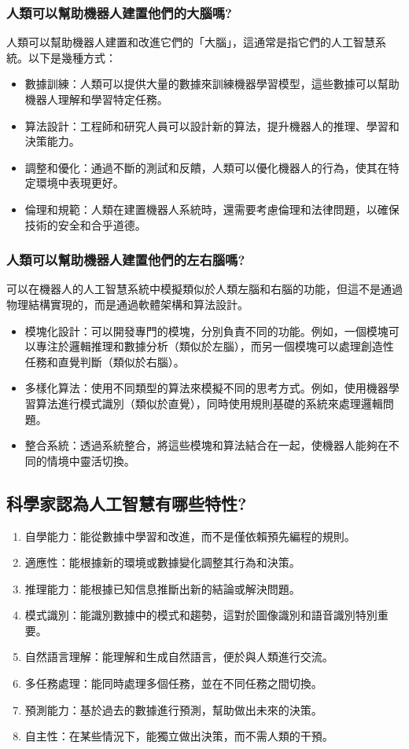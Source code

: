 \subsubsection{人類可以幫助機器人建置他們的大腦嗎?}
人類可以幫助機器人建置和改進它們的「大腦」，這通常是指它們的人工智慧系統。以下是幾種方式：
\begin{itemize}
    \item 數據訓練：人類可以提供大量的數據來訓練機器學習模型，這些數據可以幫助機器人理解和學習特定任務。
    \item 算法設計：工程師和研究人員可以設計新的算法，提升機器人的推理、學習和決策能力。 
    \item 調整和優化：通過不斷的測試和反饋，人類可以優化機器人的行為，使其在特定環境中表現更好。 
    \item 倫理和規範：人類在建置機器人系統時，還需要考慮倫理和法律問題，以確保技術的安全和合乎道德。
\end{itemize}

\subsubsection{人類可以幫助機器人建置他們的左右腦嗎?}
可以在機器人的人工智慧系統中模擬類似於人類左腦和右腦的功能，但這不是通過物理結構實現的，而是通過軟體架構和算法設計。
\begin{itemize}
    \item 模塊化設計：可以開發專門的模塊，分別負責不同的功能。例如，一個模塊可以專注於邏輯推理和數據分析（類似於左腦），而另一個模塊可以處理創造性任務和直覺判斷（類似於右腦）。
    \item 多樣化算法：使用不同類型的算法來模擬不同的思考方式。例如，使用機器學習算法進行模式識別（類似於直覺），同時使用規則基礎的系統來處理邏輯問題。
    \item 整合系統：透過系統整合，將這些模塊和算法結合在一起，使機器人能夠在不同的情境中靈活切換。
\end{itemize}

\subsection{科學家認為人工智慧有哪些特性?}
\begin{enumerate}
    \item 自學能力：能從數據中學習和改進，而不是僅依賴預先編程的規則。
    \item 適應性：能根據新的環境或數據變化調整其行為和決策。
    \item 推理能力：能根據已知信息推斷出新的結論或解決問題。
    \item 模式識別：能識別數據中的模式和趨勢，這對於圖像識別和語音識別特別重要。
    \item 自然語言理解：能理解和生成自然語言，便於與人類進行交流。
    \item 多任務處理：能同時處理多個任務，並在不同任務之間切換。
    \item 預測能力：基於過去的數據進行預測，幫助做出未來的決策。
    \item 自主性：在某些情況下，能獨立做出決策，而不需人類的干預。
\end{enumerate}
